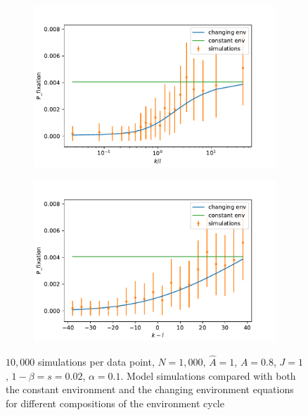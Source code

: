 \documentclass[11pt]{article}
\begin{document}
\begin{figure}[t]
  \begin{center}
  \begin{subfigure}[a]{0.49\linewidth}
    \includegraphics[width=\linewidth]{../figures/changed_env/ch_env_var_k_div_l.pdf}
   \end{subfigure}
   \begin{subfigure}[a]{0.49\linewidth}
    \includegraphics[width=\linewidth]{../figures/changed_env/ch_env_var_k_min_l.pdf}
   \end{subfigure}
  \end{center}
  \caption{$10,000$ simulations per data point, $N=1,000$, $\hat{A}=1$, $A=0.8$, $J=1$, $1-\beta=s=0.02$, $\alpha=0.1$.
  Model simulations compared with both the constant environment and the changing environment equations for different compositions of the environment cycle}
  \label{fig:ch_env_k_l}
\end{figure}
\end{document}
